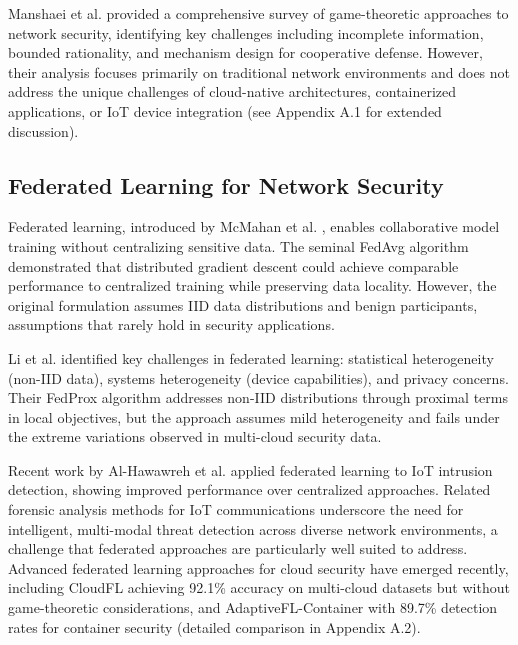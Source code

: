 \documentclass[12pt,a4paper]{article}
\newcommand{\rev}[1]{\textcolor{revcolor}{#1}}
\theoremstyle{definition}
\begin{document}
Manshaei et al. \cite{manshaei2013game} provided a comprehensive survey of game-theoretic approaches to network security, identifying key challenges including incomplete information, bounded rationality, and mechanism design for cooperative defense. However, their analysis focuses primarily on traditional network environments and does not address the unique challenges of cloud-native architectures, containerized applications, or IoT device integration (see Appendix A.1 for extended discussion).

\subsection{Federated Learning for Network Security}

Federated learning, introduced by McMahan et al. \cite{mcmahan2017communication}, enables collaborative model training without centralizing sensitive data. The seminal FedAvg algorithm demonstrated that distributed gradient descent could achieve comparable performance to centralized training while preserving data locality. However, the original formulation assumes IID data distributions and benign participants, assumptions that rarely hold in security applications.

Li et al. \cite{li2020federated} identified key challenges in federated learning: statistical heterogeneity (non-IID data), systems heterogeneity (device capabilities), and privacy concerns. Their FedProx algorithm addresses non-IID distributions through proximal terms in local objectives, but the approach assumes mild heterogeneity and fails under the extreme variations observed in multi-cloud security data.

Recent work by Al-Hawawreh et al. \cite{alhawawreh2018federated} applied federated learning to IoT intrusion detection, showing improved performance over centralized approaches. \rev{Related forensic analysis methods for IoT communications \cite{ding2024survey} underscore the need for intelligent, multi-modal threat detection across diverse network environments, a challenge that federated approaches are particularly well suited to address.} Advanced federated learning approaches for cloud security have emerged recently, including CloudFL \cite{wang2024cloudfl} achieving 92.1\% accuracy on multi-cloud datasets but without game-theoretic considerations, and AdaptiveFL-Container \cite{chen2024adaptive} with 89.7\% detection rates for container security (detailed comparison in Appendix A.2).
\end{document}
